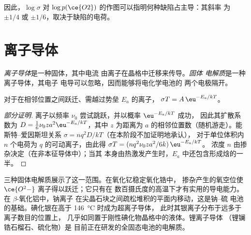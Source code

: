 因此，$\log\sigma$ 对 $\log p(\ce{O2})$ 的作图可以指明何种缺陷占主导：其斜率
为 $\pm 1/4$ 或 $\pm 1/6$，取决于缺陷的电荷。

\section{离子导体}

\begin{definition}[离子导体]\label{def:b3:solid-state:ionic-conductor}
\emph{离子导体}是一种固体，其中电流
由离子在晶格中迁移来传导。\emph{固体
电解质}是一种离子导体，其电子
电导可以忽略，因而能够将电化学电池的
两个电极隔开。
\end{definition}

\begin{proposition}[离子导电的阿伦尼乌斯定律]\label{prop:b3:solid-state:ionic-arrhenius}
对于在相邻位置之间跃迁、需越过势垒 $E_a$ 的离子，
$\sigma T = A\,\eu^{-E_a/kT}$。
\end{proposition}

\begin{proof}[部分证明]
离子以频率 $\nu_0$ 尝试跳跃，并以概率 $\eu^{-E_a/kT}$ 成功，
因此其扩散系数为 $D = \tfrac16\nu_0 z a^2\eu^{-E_a/kT}$，其中 $z$ 为距离为
$a$ 的相邻位置数（随机游走）。能斯特–爱因斯坦关系 $\sigma = nq^2D/kT$（在本阶段不加证明地承认），
对于单位体积内 $n$ 个电荷为 $q$ 的可动离子，由此得 $\sigma T = (nq^2\nu_0za^2/6k)\,\eu^{-E_a/kT}$。
浓度 $n$ 由掺杂决定（在非本征导体中）；当其
本身由热激发产生时，$E_a$ 中还包含形成焓的一半。
\end{proof}

三种固体电解质展示了这一范围。在氧化钇稳定氧化锆中，
掺杂产生的氧空位使 $\ce{O^2-}$ 离子得以跃迁；它只有在
数百摄氏度的高温下才有实用的导电能力。在 $\beta$-氧化铝中，钠离子
在尖晶石块之间疏松堆积的平面内移动，这是钠–硫
电池的基础。碘化银在高于 \qty{146}{\celsius} 时成为超离子导体，
此时其银离子分布于远多于离子数目的位置上，
几乎如同置于刚性碘化物晶格中的液体。锂离子导体
（锂镧锆石榴石、硫化物）是
目前正在研发的全固态电池的电解质。

